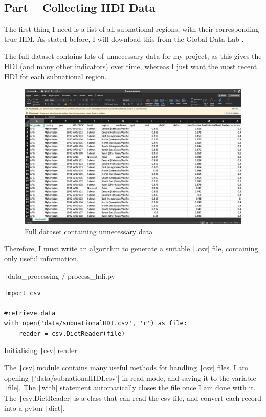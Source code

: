 \documentclass[12pt]{report}
\newcommand{\pil}[1]{\protect\texttt|#1|}
\begin{document}
\subsection{Part \theparts{} -- Collecting HDI Data}\label{sec:collectHDI}
The first thing I need is a list of all subnational regions, with their corresponding true HDI. As stated before, I will download this from the Global Data Lab \cite{hdiData}.

The full dataset contains lots of unnecessary data for my project, as this gives the HDI (and many other indicators) over time, whereas I just want the most recent HDI for each subnational region.

\begin{figure}[H]
\centering
\includegraphics[width=12cm]{ss1.1.png}
\caption{Full dataset containing unnecessary data}
\end{figure}

Therefore, I must write an algorithm to generate a suitable \pil{.csv} file, containing only useful information.

\begin{listing}[H]
\pil{data_processing / process_hdi.py}
\begin{verbatim}
import csv

#retrieve data
with open('data/subnationalHDI.csv', 'r') as file:
    reader = csv.DictReader(file)
\end{verbatim}
\caption{Initialising \pil{csv} reader}\label{cs:csvReader}
\end{listing}
The \pil{csv} module contains many useful methods for handling \pil{csv} files. I am opening \pil{'data/subnationalHDI.csv'} in read mode, and saving it to the variable \pil{file}. The \pil{with} statement automatically closes the file once I am done with it. The \pil{csv.DictReader} is a class that can read the csv file, and convert each record into a pyton \pil{dict}.
\end{document}
